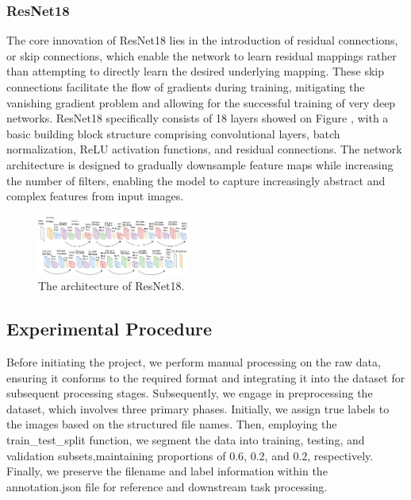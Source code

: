 \documentclass[final,5p,times,twocolumn,sort&compress]{elsarticle}
\begin{document}
\subsubsection{ResNet18}
The core innovation of ResNet18 lies in the introduction of residual connections, or skip connections, which enable the network to learn residual mappings rather than attempting to directly learn the desired underlying mapping. These skip connections facilitate the flow of gradients during training, mitigating the vanishing gradient problem and allowing for the successful training of very deep networks. ResNet18 specifically consists of 18 layers showed on Figure \cite{7780459}, with a basic building block structure comprising convolutional layers, batch normalization, ReLU activation functions, and residual connections. The network architecture is designed to gradually downsample feature maps while increasing the number of filters, enabling the model to capture increasingly abstract and complex features from input images.

\begin{figure}[H]
    \centering
    \includegraphics[width=0.45\textwidth]{./img/ResNet18_arch.jpg}
    \caption{The architecture of ResNet18.}
    \label{fig:ResNet18_arch}
\end{figure}

\subsection{Experimental Procedure}
Before initiating the project, we perform manual processing on the raw data, ensuring it conforms to the required format and integrating it into the dataset for subsequent processing stages. Subsequently, we engage in preprocessing the dataset, which involves three primary phases. Initially, we assign true labels to the images based on the structured file names. Then, employing the train\_test\_split function, we segment the data into training, testing, and validation subsets,maintaining proportions of $0.6$, $0.2$, and $0.2$, respectively. Finally, we preserve the filename and label information within the annotation.json file for reference and downstream task processing.
\end{document}
